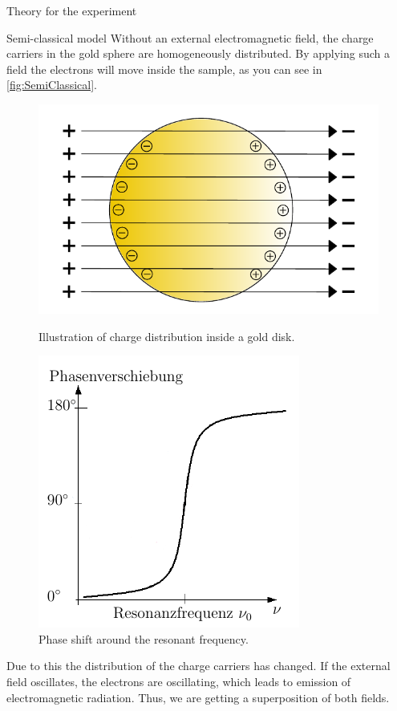 \documentclass[pdftex, a4paper,11pt, twoside, UKenglish]{report}
\begin{document}
\begin{chapter}{Theory for the experiment}
    
    
    \begin{section}{Semi-classical model}
        Without an external electromagnetic field, the charge carriers in the
        gold sphere are homogeneously distributed.
        By applying such a field the electrons will move inside the sample, as
        you can see in \cref{fig:SemiClassical}. 
        \begin{figure}[htbp]
          \centering
          \begin{minipage}{.48\textwidth}
            \centering
            \includegraphics[width=\textwidth]{Figures/SemiClassical.png}
            \caption{Illustration of charge distribution inside a gold disk.}
            \label{fig:SemiClassical}
          \end{minipage}\quad
          \begin{minipage}{.48\textwidth}
            \centering
            \includegraphics[width=.6\textwidth]{Figures/Phaseshift.png}
            \caption{Phase shift around the resonant frequency.}
            \label{fig:Phaseshift}
          \end{minipage}
        \end{figure}
        Due to this the distribution of the charge carriers has changed.
        If the external field oscillates, the electrons are oscillating, which
        leads to emission of electromagnetic radiation.
        Thus, we are getting a superposition of both fields.


\end{section}
\end{chapter}
\end{document}
